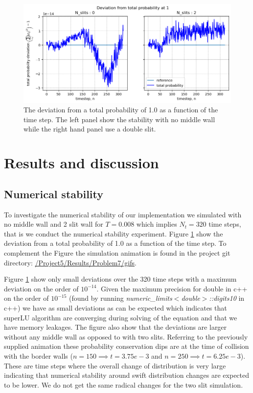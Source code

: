 \documentclass[../main_proj5.tex]{subfiles}
\begin{document}
\begin{figure}[ht!]
    \centering
    \includegraphics[width=0.8\linewidth]{Project 5/figures/problem7_M201_Nslits0_N_slits2_tot_prob.png}
    \caption{The deviation from a total probability of 1.0 as a function of the time step. The left panel show the stability with no middle wall while the right hand panel use a double slit.}
    \label{fig:p5_computational_stability}
\end{figure}

\section{Results and discussion}\label{sec:p5_results_and_discussion}

\subsection{Numerical stability}

To investigate the numerical stability of our implementation we simulated with no middle wall and 2 slit wall for $T=0.008$ which implies $N_t = 320$ time steps, that is we conduct the numerical stability experiment. Figure \ref{fig:p5_computational_stability} show the deviation from a total probability of 1.0 as a function of the time step. To complement the Figure the simulation animation is found in the project git directory: \href{https://github.uio.no/johannlf/FYS3150/tree/main/Project5/Results/Problem%207/gifs}{/Project5/Results/Problem7/gifs}. 



Figure \ref{fig:p5_computational_stability} show only small deviations over the 320 time steps with a maximum deviation on the order of $10^{-14}$. Given the maximum precision for double in c++ on the order of $10^{-15}$ (found by running \textit{numeric\_limits$<$double$>$::digits10} in c++) we have as small deviations as can be expected which indicates that superLU algorithm are converging during solving of the equation and that we have memory leakages. The figure also show that the deviations are larger without any middle wall as opposed to with two slits. Referring to the previously supplied animation these probability conservation dips are at the time of collision with the border walls ($n=150 \implies t=3.75e-3$ and $n=250 \implies t=6.25e-3$). These are time steps where the overall change of distribution is very large indicating that numerical stability around swift distribution changes are expected to be lower. We do not get the same radical changes for the two slit simulation.
\end{document}
